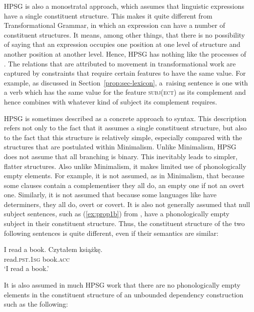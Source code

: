 \documentclass[output=paper
	        ,collection
	        ,collectionchapter
 	        ,biblatex
                ,babelshorthands
                ,newtxmath
                ,draftmode
                ,colorlinks, citecolor=brown
]{langscibook}
\begin{document}
HPSG is also a monostratal approach, which assumes that linguistic expressions have a single
constituent structure. This makes it quite different from Transformational Grammar, in which an
expression can have a number of constituent structures. It means, among other things, that there is
no possibility of saying that an expression occupies one position at one level of structure and
another position at another level. Hence, HPSG has nothing like the  processes of
. The relations that are attributed to movement in transformational work are
captured by constraints that require certain features to have the same value. For example, as
discussed in Section~\ref{prop:sec-lexicon}, a~raising sentence is one with a verb which has the
same value for the feature \textsc{subj(ect)} as its complement and hence combines with whatever
kind of subject its complement requires. 

HPSG is sometimes described as a concrete approach to syntax. This description refers not only to
the fact that it assumes a single constituent structure, but also to the fact that this structure is
relatively simple, especially compared with the structures that are postulated within
Minimalism\indexmp. Unlike Minimalism, HPSG does not assume that all branching
is binary. This inevitably leads to simpler, flatter structures. Also unlike Minimalism, it makes
limited use of phonologically empty elements. For example, it is not assumed, as in Minimalism, that
because some clauses contain a complementiser they all do, an empty one if not an overt
one. Similarly, it is not assumed that because some languages like  have determiners, they
all do, overt or covert. It is also not generally assumed that null subject sentences, such as
(\ref{ex:prop1b}) from , have a phonologically empty subject in their constituent
structure. Thus, the constituent structure of the two following sentences is quite different, even
if their semantics are similar:

\eal\label{ex:prop1}
\ex\label{ex:prop1a}
I read a book.
\ex\label{ex:prop1b}
\gll Czytałem książkę.\\
     read\textsc{.pst.1sg} book\textsc{.acc}\\
\glt `I read a book.'
\zl

\noindent
It is also assumed in much HPSG work that there are no phonologically empty elements in the
constituent structure of an unbounded dependency construction such as the following:
\end{document}
